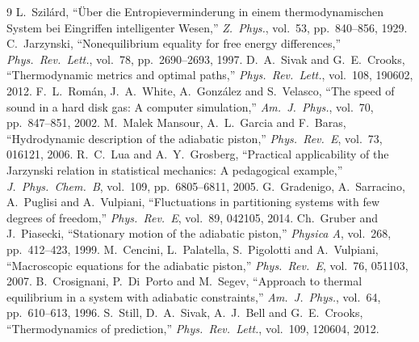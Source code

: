 \documentclass[journal]{IEEEtran}
\begin{document}
\begin{thebibliography}{9}
 L.~Szil\'ard, ``\"Uber die Entropieverminderung in einem thermodynamischen
System bei Eingriffen intelligenter Wesen,'' \emph{Z.\ Phys.}, vol.~53, pp.~840--856, 1929.
 C.~Jarzynski, ``Nonequilibrium equality for free energy differences,''
\emph{Phys.\ Rev.\ Lett.}, vol.~78, pp.~2690--2693, 1997.
 D.~A.~Sivak and G.~E.~Crooks, ``Thermodynamic metrics and optimal paths,''
\emph{Phys.\ Rev.\ Lett.}, vol.~108, 190602, 2012.
 F.~L.~Rom\'an, J.~A.~White, A.~Gonz\'alez and S.~Velasco, ``The speed of sound
in a hard disk gas: A computer simulation,'' \emph{Am.\ J.\ Phys.}, vol.~70, pp.~847--851, 2002.
 M.~Malek Mansour, A.~L.~Garcia and F.~Baras, ``Hydrodynamic description of
the adiabatic piston,'' \emph{Phys.\ Rev.\ E}, vol.~73, 016121, 2006.
 R.~C.~Lua and A.~Y.~Grosberg, ``Practical applicability of the Jarzynski relation
in statistical mechanics: A pedagogical example,'' \emph{J.\ Phys.\ Chem.\ B}, vol.~109,
pp.~6805--6811, 2005.
 G.~Gradenigo, A.~Sarracino, A.~Puglisi and A.~Vulpiani, ``Fluctuations in
partitioning systems with few degrees of freedom,'' \emph{Phys.\ Rev.\ E}, vol.~89, 042105, 2014.
 Ch.~Gruber and J.~Piasecki, ``Stationary motion of the adiabatic piston,''
\emph{Physica A}, vol.~268, pp.~412--423, 1999.
 M.~Cencini, L.~Palatella, S.~Pigolotti and A.~Vulpiani, ``Macroscopic
equations for the adiabatic piston,'' \emph{Phys.\ Rev.\ E}, vol.~76, 051103, 2007.
 B.~Crosignani, P.~Di~Porto and M.~Segev, ``Approach to thermal equilibrium
in a system with adiabatic constraints,'' \emph{Am.\ J.\ Phys.}, vol.~64, pp.~610--613, 1996.
 S.~Still, D.~A.~Sivak, A.~J.~Bell and G.~E.~Crooks, ``Thermodynamics of
prediction,'' \emph{Phys.\ Rev.\ Lett.}, vol.~109, 120604, 2012.
\end{thebibliography}
\end{document}
